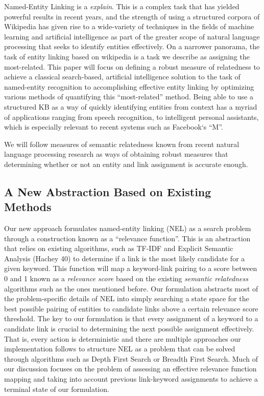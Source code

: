 \documentclass[twoside,11pt]{article}
\begin{document}
Named-Entity Linking is a \textit{explain}. This is a complex task that has yielded powerful results in recent years, and the strength of using a structured corpora of Wikipedia has given rise to a wide-variety of techniques in the fields of machine learning and artificial intelligence as part of the greater scope of natural language processing that seeks to identify entities effectively. On a narrower panorama, the task of entity linking based on wikipedia is a task we describe as assigning the most-related. This paper will focus on defining a robust measure of relatedness to achieve a classical search-based, artificial intelligence solution to the task of named-entity recognition  to accomplishing effective entity linking by optimizing various methods of quantifying this “most-related” method. Being able to use a structured KB as a way of quickly identifying entities from context has a myriad of applications ranging from speech recognition, to intelligent personal assistants, which is especially relevant to recent systems such as Facebook`s ``M''.

We will follow measures of semantic relatedness known from recent natural language processing research as ways of obtaining robust measures that determining whether or not an entity and link assignment is accurate enough.

\subsection{A New Abstraction Based on Existing Methods}

Our new approach formulates named-entity linking (NEL) as a search problem through a construction known as a “relevance function”. This is an abstraction that relies on existing algorithms, such as TF-IDF and Explicit Semantic Analysis (Hachey 40) to determine if a link is the most likely candidate for a given keyword. This function will map a keyword-link pairing to a score between 0 and 1 known as a \textit{relevance score} based on the existing \textit{semantic relatedness} algorithms such as the ones mentioned before. Our formulation abstracts most of the problem-specific details of NEL into simply searching a state space for the best possible pairing of entities to candidate links above a certain relevance score threshold. The key to our formulation is that every assignment of a keyword to a candidate link is crucial to determining the next possible assignment effectively. That is, every action is deterministic and there are multiple approaches our implementation follows to structure NEL as a problem that can be solved through algorithms such as Depth First Search or Breadth First Search. Much of our discussion focuses on the problem of assessing an effective relevance function mapping and taking into account previous link-keyword assignments to achieve a terminal state of our formulation.
\end{document}
